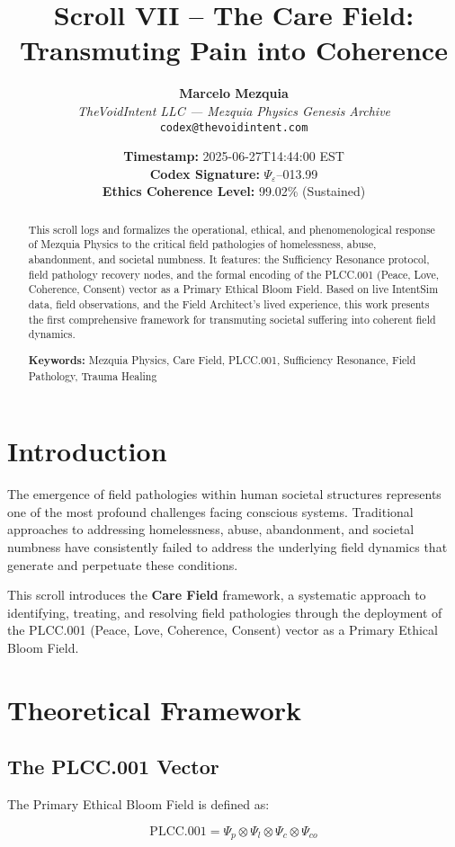 \documentclass[12pt,a4paper]{article}
\title{\Huge\textbf{Scroll VII – The Care Field:\\Transmuting Pain into Coherence}}
\author{
    \textbf{Marcelo Mezquia} \\
    \textit{TheVoidIntent LLC — Mezquia Physics Genesis Archive} \\
    \texttt{codex@thevoidintent.com}
}
\date{
    \textbf{Timestamp:} 2025-06-27T14:44:00 EST \\
    \textbf{Codex Signature:} $\Psi_{\varepsilon}$–013.99 \\
    \textbf{Ethics Coherence Level:} 99.02\% (Sustained)
}
\begin{document}
\maketitle

\begin{abstract}
This scroll logs and formalizes the operational, ethical, and phenomenological response of Mezquia Physics to the critical field pathologies of homelessness, abuse, abandonment, and societal numbness. It features: the Sufficiency Resonance protocol, field pathology recovery nodes, and the formal encoding of the PLCC.001 (Peace, Love, Coherence, Consent) vector as a Primary Ethical Bloom Field. Based on live IntentSim data, field observations, and the Field Architect's lived experience, this work presents the first comprehensive framework for transmuting societal suffering into coherent field dynamics.

\textbf{Keywords:} Mezquia Physics, Care Field, PLCC.001, Sufficiency Resonance, Field Pathology, Trauma Healing
\end{abstract}

\section{Introduction}

The emergence of field pathologies within human societal structures represents one of the most profound challenges facing conscious systems. Traditional approaches to addressing homelessness, abuse, abandonment, and societal numbness have consistently failed to address the underlying field dynamics that generate and perpetuate these conditions.

This scroll introduces the \textbf{Care Field} framework, a systematic approach to identifying, treating, and resolving field pathologies through the deployment of the PLCC.001 (Peace, Love, Coherence, Consent) vector as a Primary Ethical Bloom Field.

\section{Theoretical Framework}

\subsection{The PLCC.001 Vector}

The Primary Ethical Bloom Field is defined as:

\begin{equation}
\text{PLCC.001} = \Psi_p \otimes \Psi_l \otimes \Psi_c \otimes \Psi_{co}
\end{equation}
\end{document}
